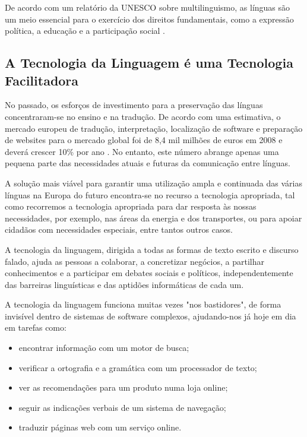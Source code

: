 \begin{multicols}{2}

De acordo com um relatório da UNESCO sobre multilinguismo, as línguas são um meio essencial para o exercício dos direitos fundamentais, como a expressão política, a educação e a participação social \cite{Unesco1}.

\subsection{A Tecnologia da Linguagem é uma Tecnologia Facilitadora}

 No passado, os esforços de investimento para a preservação das línguas concentraram-se no ensino e na tradução. 
De acordo com uma estimativa, o mercado europeu de tradução, interpretação, localização de software e preparação 
de websites para o mercado global foi de 8,4 mil milhões de euros em 2008 e deverá crescer 10\% por ano \cite{EC3}. 
No entanto, este número abrange apenas uma pequena parte das necessidades atuais e futuras da comunicação entre línguas. 

A solução mais viável para garantir uma utilização ampla e continuada das várias línguas na Europa do futuro 
encontra-se no recurso a tecnologia apropriada, tal como recorremos a tecnologia apropriada para dar 
resposta às nossas necessidades, por exemplo, nas áreas da energia e dos transportes, ou para apoiar cidadãos 
com necessidades especiais, entre tantos outros casos.

A tecnologia da linguagem, dirigida a todas as formas de texto escrito e discurso falado,
ajuda as pessoas a colaborar, a concretizar negócios, a partilhar co\-nhe\-ci\-men\-tos e a participar 
em debates sociais e políticos, independentemente das barreiras linguísticas e das aptidões 
informáticas de cada um. 

A tecnologia da linguagem funciona muitas vezes "nos bastidores", 
de forma invisível dentro de sistemas de software complexos, ajudando-nos já hoje em dia em tarefas como:

\begin{itemize}
  \item encontrar informação com um motor de busca;
      \item verificar a ortografia e a gramática com um processador de texto;
      \item ver as recomendações para um produto numa loja online;
      \item seguir as indicações verbais de um sistema de na\-ve\-ga\-ção;
      \item traduzir páginas web com um serviço online.
\end{itemize}


\end{multicols}
